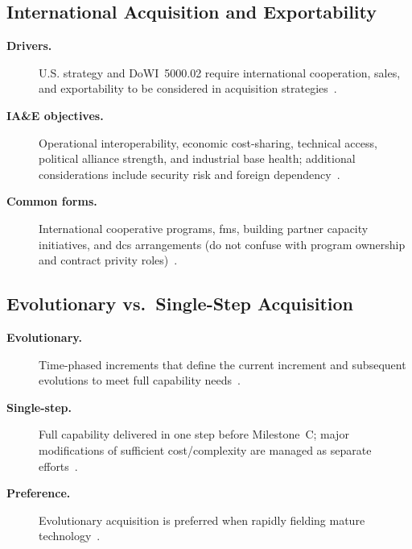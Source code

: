 \documentclass[../main.tex]{subfiles}
\begin{document}
\subsection{International Acquisition and Exportability}
\begin{description}
  \item[\textbf{Drivers.}] U.S. strategy and DoWI~5000.02 require international cooperation, sales, and exportability to be considered in acquisition strategies~\autocite{DoDI5000-02,edo-3-3-2-acq-milestones-phases-2025}.
  \item[\textbf{IA\&E objectives.}] Operational interoperability, economic cost-sharing, technical access, political alliance strength, and industrial base health; additional considerations include security risk and foreign dependency~\autocite{edo-3-3-2-acq-milestones-phases-2025}.
  \item[\textbf{Common forms.}] International cooperative programs, \ac{fms}, building partner capacity initiatives, and \ac{dcs} arrangements (do not confuse with program ownership and contract privity roles)~\autocite{edo-3-3-2-acq-milestones-phases-2025}.
\end{description}

\subsection{Evolutionary vs.\ Single-Step Acquisition}
\begin{description}
  \item[\textbf{Evolutionary.}] Time-phased increments that define the current increment and subsequent evolutions to meet full capability needs~\autocite{DoDI5000-02,DoDI5000-85,edo-3-3-2-acq-milestones-phases-2025}.
  \item[\textbf{Single-step.}] Full capability delivered in one step before Milestone~C; major modifications of sufficient cost/complexity are managed as separate efforts~\autocite{DoDI5000-02,DoDI5000-85,edo-3-3-2-acq-milestones-phases-2025}.
  \item[\textbf{Preference.}] Evolutionary acquisition is preferred when rapidly fielding mature technology~\autocite{DoDI5000-02,DoDI5000-85,edo-3-3-2-acq-milestones-phases-2025}.
\end{description}
\end{document}
